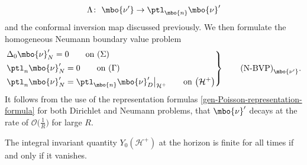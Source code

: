 \begin{align*}
\Lambda \colon\ \mbo{\nu'} \to \ptl_{\mbo{n}} \mbo{\nu}'
\end{align*}
 and the conformal inversion map discussed previously. We then formulate the homogeneous Neumann boundary value problem
\begin{equation*}
\left.\begin{aligned}
&\Delta_0 \mbo{\nu}_N'=0 \qquad \text{on} \ (\Sigma)\\
&\ptl_n \mbo{\nu}'_N=0 \qquad \text{on} \ (\Gamma) \\
&\ptl_n \mbo{\nu}'_N= \ptl_{\mbo{n}} \mbo{\nu}'_D \big\vert_{\mathcal{H}^+} \qquad \text{on} \ \bigl(\mathcal{H}^{+}\bigr)
\end{aligned}
 \right\}
\qquad \text{(N-BVP)}_{\mbo{\nu'}}.
\end{equation*}
It follows from the use of the representation formulas \eqref{gen-Poisson-representation-formula} for both Dirichlet and Neumann problems, that $\mbo{\nu}'$ decays at the rate of $\mathcal{O}\bigl(\frac{1}{R}\bigr)$ for large $R$.
\begin{Proposition}
	The integral invariant quantity $Y_0(\mathcal{H}^+)$ at the horizon is finite for all times if and only if it vanishes.
\end{Proposition}

